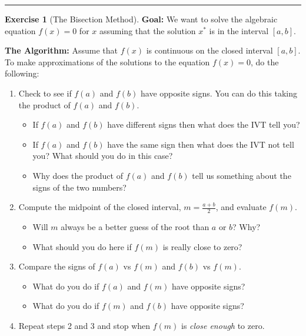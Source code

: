 \documentclass[
]{book}
\theoremstyle{definition}
\theoremstyle{definition}
\theoremstyle{definition}
\newtheorem{exercise}{Exercise}[chapter]
\theoremstyle{remark}
\begin{document}
\begin{center}\rule{0.5\linewidth}{0.5pt}\end{center}

\begin{exercise}[The Bisection Method]
\protect\hypertarget{exr:unnamed-chunk-78}{}{\label{exr:unnamed-chunk-78} {} }\textbf{Goal:} We want to solve the algebraic equation \(f(x) = 0\) for \(x\) assuming that the solution \(x^*\) is in the interval \([a,b]\).

\textbf{The Algorithm:} Assume that \(f(x)\) is continuous on the closed interval \([a,b]\). To make
approximations of the solutions to the equation \(f(x) = 0\), do the
following:

\begin{enumerate}
\def\labelenumi{\arabic{enumi}.}
\item
  Check to see if \(f(a)\) and \(f(b)\) have opposite signs. You can do
  this taking the product of \(f(a)\) and \(f(b)\).

  \begin{itemize}
  \item
    If \(f(a)\) and \(f(b)\) have different signs then what does the IVT
    tell you?
  \item
    If \(f(a)\) and \(f(b)\) have the same sign then what does the IVT
    not tell you? What should you do in this case?
  \item
    Why does the product of \(f(a)\) and \(f(b)\) tell us something
    about the signs of the two numbers?
  \end{itemize}
\item
  Compute the midpoint of the closed interval, \(m=\frac{a+b}{2}\), and
  evaluate \(f(m)\).

  \begin{itemize}
  \item
    Will \(m\) always be a better guess of the root than \(a\) or \(b\)?
    Why?
  \item
    What should you do here if \(f(m)\) is really close to zero?
  \end{itemize}
\item
  Compare the signs of \(f(a)\) vs \(f(m)\) and \(f(b)\) vs \(f(m)\).

  \begin{itemize}
  \item
    What do you do if \(f(a)\) and \(f(m)\) have opposite signs?
  \item
    What do you do if \(f(m)\) and \(f(b)\) have opposite signs?
  \end{itemize}
\item
  Repeat steps 2 and 3 and stop when \(f(m)\) is \emph{close enough} to zero.
\end{enumerate}
\end{exercise}
\end{document}
